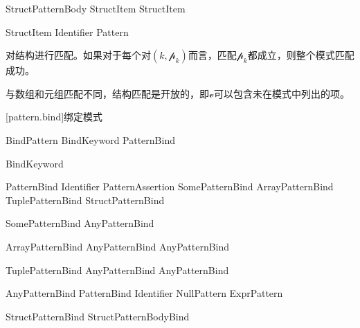 \begin{bnf}{StructPatternBody}
    StructItem \bnflp\terminal{,} StructItem\bnfrp\bnfs
\end{bnf}

\begin{bnf}{StructItem}
    Identifier \terminal{:} Pattern
\end{bnf}

\pnum
{}对结构进行匹配。如果对于每个对$(k, \mathcal{p}_k)$而言，匹配$\mathcal{p}_k$都成立，则整个模式匹配成功。

\pnum
与数组和元组匹配不同，结构匹配是开放的，即$\mathcal{v}$可以包含未在模式中列出的项。

[pattern.bind]{绑定模式}

\begin{bnf}{BindPattern}
    BindKeyword PatternBind
\end{bnf}

\begin{bnf}{BindKeyword}
     \br
      \br
     
\end{bnf}

\begin{bnf}{PatternBind}
    Identifier PatternAssertion \br
    SomePatternBind \br
    ArrayPatternBind \br
    TuplePatternBind \br
    StructPatternBind
\end{bnf}

\begin{bnf}{SomePatternBind}
     AnyPatternBind
\end{bnf}

\begin{bnf}{ArrayPatternBind}
    \terminal{[} AnyPatternBind \bnflp\terminal{,} AnyPatternBind\bnfrp\bnfs \terminal{]}
\end{bnf}

\begin{bnf}{TuplePatternBind}
    \terminal{(} AnyPatternBind \bnflp\terminal{,} AnyPatternBind\bnfrp\bnfs \terminal{)}
\end{bnf}

\begin{bnf}{AnyPatternBind}
    PatternBind \br
     Identifier\bnfq \br
    NullPattern \br
    ExprPattern
\end{bnf}

\begin{bnf}{StructPatternBind}
    \terminal{\{} StructPatternBodyBind \terminal{\}}
\end{bnf}

